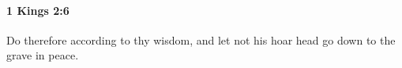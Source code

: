 
		\paragraph{1 Kings 2:6} %
			\label{1KINGS-2-6}

			Do therefore according to thy wisdom, and let not his hoar head go down to the grave in peace.


